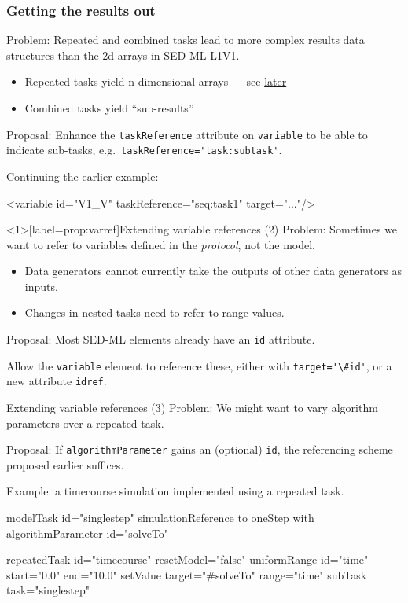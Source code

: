 \documentclass[t,xcolor={usenames,dvipsnames}]{beamer}
\newcommand{\sedml}[1]{\lstinline[basicstyle=\color{blue}]!#1!}
\begin{document}
\begin{frame}[fragile=singleslide]
\frametitle{Getting the results out}
\alert{Problem}:
 Repeated and combined tasks lead to more complex results data
 structures than the 2d arrays in SED-ML L1V1.

\begin{itemize}
\item Repeated tasks yield n-dimensional arrays
      --- see \hyperlink{prop:nd}{later}
\item Combined tasks yield ``sub-results''
\end{itemize}

\alert{Proposal}:
 Enhance the \sedml{taskReference} attribute on \sedml{variable} to be
 able to indicate sub-tasks,
 e.g.\ \sedml{taskReference='task:subtask'}.

Continuing the earlier example:
\begin{blksedml}
<variable id="V1_V" taskReference="seq:task1"
          target="..."/>
\end{blksedml}
\end{frame}


\begin{frame}<1>[label=prop:varref]{Extending variable references (2)}
\alert{Problem}:
 Sometimes we want to refer to variables defined in the
 \emph{protocol}, not the model.

\begin{itemize}
\item
 Data generators cannot currently take the outputs of other data
 generators as inputs.
\item
 Changes in nested tasks need to refer to range values.
\end{itemize}

\alert{Proposal}:
 Most SED-ML elements already have an \sedml{id} attribute.

 Allow the \sedml{variable} element to reference these, either with
 \sedml{target='\#id'}, or a new attribute \sedml{idref}.
\end{frame}


\begin{frame}[fragile=singleslide]{Extending variable references (3)}
\alert{Problem}:
 We might want to vary algorithm parameters over a repeated task.

\alert{Proposal}:
 If \sedml{algorithmParameter} gains an (optional) \sedml{id}, the
 referencing scheme proposed earlier suffices.

Example: a timecourse simulation implemented using a repeated task.
\begin{blksedml}
modelTask id="singlestep"
  simulationReference to
    oneStep with algorithmParameter id="solveTo"

repeatedTask id="timecourse" resetModel="false"
  uniformRange id="time" start="0.0" end="10.0"
  setValue target="#solveTo" range="time"
  subTask task="singlestep"
\end{blksedml}
\end{frame}
\end{document}
